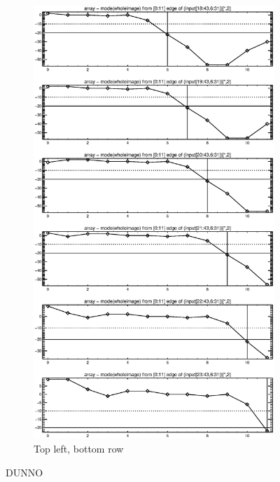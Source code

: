 \documentclass[10pt]{article}
\begin{document}
\begin{figure}[!h]
\begin{subfigure}[b]{.4\linewidth}
        \centering
        \includegraphics[width=1.4\textwidth]{plots_tables_images/topright3.eps} 
        \caption{Top left, bottom row}
    \end{subfigure}
    \caption{DUNNO}
\end{figure}


\end{document}
